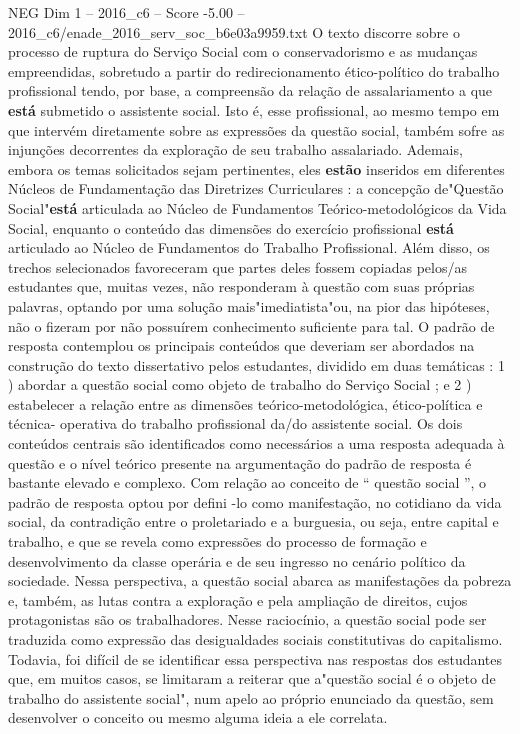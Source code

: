 \begin{textsample}{NEG Dim 1 – 2016\_c6 – Score -5.00 – 2016\_c6/enade\_2016\_serv\_soc\_b6e03a9959.txt}
O texto discorre sobre o processo de ruptura do Serviço Social com o conservadorismo e as mudanças empreendidas, sobretudo a partir do redirecionamento ético-político do trabalho profissional tendo, por base, a compreensão da relação de assalariamento a que \textbf{está} submetido o assistente social.
Isto é, esse profissional, ao mesmo tempo em que intervém diretamente sobre as expressões da questão social, também sofre as injunções decorrentes da exploração de seu trabalho assalariado.
Ademais, embora os temas solicitados sejam pertinentes, eles \textbf{estão} inseridos em diferentes Núcleos de Fundamentação das Diretrizes Curriculares : a concepção de"Questão Social"\textbf{está} articulada ao Núcleo de Fundamentos Teórico-metodológicos da Vida Social, enquanto o conteúdo das dimensões do exercício profissional \textbf{está} articulado ao Núcleo de Fundamentos do Trabalho Profissional.
Além disso, os trechos selecionados favoreceram que partes deles fossem copiadas pelos/as estudantes que, muitas vezes, não responderam à questão com suas próprias palavras, optando por uma solução mais"imediatista"ou, na pior das hipóteses, não o fizeram por não possuírem conhecimento suficiente para tal.
O padrão de resposta contemplou os principais conteúdos que deveriam ser abordados na construção do texto dissertativo pelos estudantes, dividido em duas temáticas : 1 ) abordar a questão social como objeto de trabalho do Serviço Social ; e 2 ) estabelecer a relação entre as dimensões teórico-metodológica, ético-política e técnica- operativa do trabalho profissional da/do assistente social.
Os dois conteúdos centrais são identificados como necessários a uma resposta adequada à questão e o nível teórico presente na argumentação do padrão de resposta é bastante elevado e complexo.
Com relação ao conceito de “ questão social ”, o padrão de resposta optou por defini -lo como manifestação, no cotidiano da vida social, da contradição entre o proletariado e a burguesia, ou seja, entre capital e trabalho, e que se revela como expressões do processo de formação e desenvolvimento da classe operária e de seu ingresso no cenário político da sociedade.
Nessa perspectiva, a questão social abarca as manifestações da pobreza e, também, as lutas contra a exploração e pela ampliação de direitos, cujos protagonistas são os trabalhadores.
Nesse raciocínio, a questão social pode ser traduzida como expressão das desigualdades sociais constitutivas do capitalismo.
Todavia, foi difícil de se identificar essa perspectiva nas respostas dos estudantes que, em muitos casos, se limitaram a reiterar que a"questão social é o objeto de trabalho do assistente social", num apelo ao próprio enunciado da questão, sem desenvolver o conceito ou mesmo alguma ideia a ele correlata.

\end{textsample}
